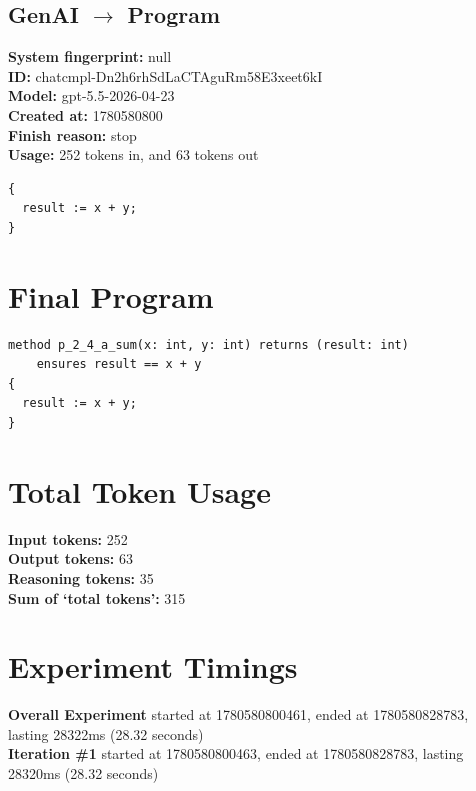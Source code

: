 \documentclass{article}
\begin{document}
\subsection*{GenAI $\rightarrow$ Program}
\textbf{System fingerprint: }null
\\\textbf{ID: }chatcmpl-Dn2h6rhSdLaCTAguRm58E3xeet6kI
\\\textbf{Model: }gpt-5.5-2026-04-23
\\\textbf{Created at: }1780580800
\\\textbf{Finish reason: }stop
\\\textbf{Usage: }252 tokens in, and 63 tokens out
\begin{lstlisting}
{
  result := x + y;
}
\end{lstlisting}
\section*{Final Program}
\begin{lstlisting}
method p_2_4_a_sum(x: int, y: int) returns (result: int)
	ensures result == x + y
{
  result := x + y;
}
\end{lstlisting}
\section*{Total Token Usage}
\textbf{Input tokens: }252
\\\textbf{Output tokens: }63
\\\textbf{Reasoning tokens: }35
\\\textbf{Sum of `total tokens': }315
\section*{Experiment Timings}
\textbf{Overall Experiment} started at 1780580800461, ended at 1780580828783, lasting 28322ms (28.32 seconds)
\\\textbf{Iteration \#1} started at 1780580800463, ended at 1780580828783, lasting 28320ms (28.32 seconds)
\end{document}
